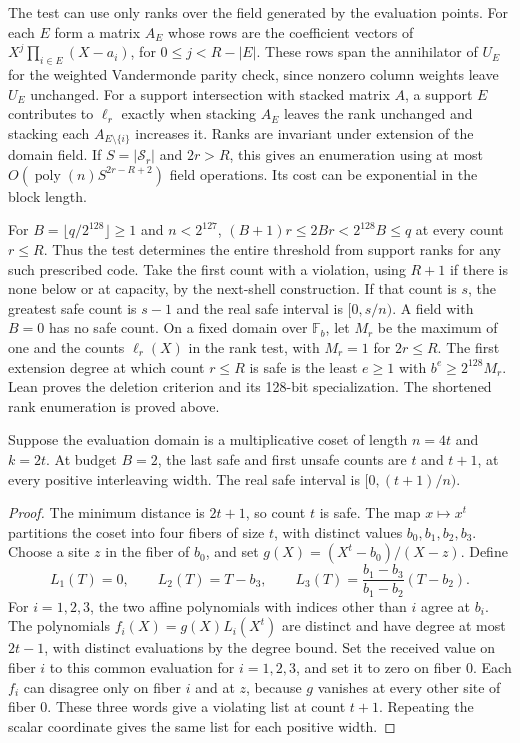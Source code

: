 The test can use only ranks over the field generated by the evaluation
points. For each \(E\) form a matrix \(A_E\) whose rows are the coefficient
vectors of \(X^j\prod_{i\in E}(X-a_i)\), for \(0\le j<R-|E|\). These
rows span the annihilator of \(U_E\) for the weighted Vandermonde parity
check, since nonzero column weights leave \(U_E\) unchanged. For a support
intersection with stacked matrix \(A\), a support \(E\) contributes to
\(\ell_r\) exactly when stacking \(A_E\) leaves the rank unchanged and
stacking each \(A_{E\setminus\{i\}}\) increases it. Ranks are invariant
under extension of the domain field. If \(S=|\mathcal S_r|\) and
\(2r>R\), this gives an enumeration using at most
\(O(\operatorname{poly}(n) S^{2r-R+2})\) field operations. Its cost can
be exponential in the block length.

For \(B=\lfloor q/2^{128}\rfloor\ge1\) and \(n<2^{127}\),
\((B+1)r\le 2Br<2^{128}B\le q\) at every count \(r\le R\).
Thus the test determines the entire threshold from support ranks for
any such prescribed code. Take the first count with a violation, using
\(R+1\) if there is none below or at capacity, by the next-shell
construction. If that count is \(s\), the greatest safe count is
\(s-1\) and the real safe interval is \([0,s/n)\). A field with
\(B=0\) has no safe count. On a fixed domain over \(\mathbb F_b\), let
\(M_r\) be the maximum of one and the counts \(\ell_r(X)\) in the rank
test, with \(M_r=1\) for \(2r\le R\). The first extension degree at
which count \(r\le R\) is safe is the least \(e\ge1\) with
\(b^e\ge2^{128}M_r\). Lean proves the deletion criterion and its
128-bit specialization. The shortened rank enumeration is proved above.

\begin{corollary}
\label{cor:list-two-half-rate}
Suppose the evaluation domain is a multiplicative coset of length
\(n=4t\) and \(k=2t\). At budget \(B=2\), the last safe and first unsafe
counts are \(t\) and \(t+1\), at every positive interleaving width.
The real safe interval is \([0,(t+1)/n)\).
\end{corollary}

\begin{proof}
The minimum distance is \(2t+1\), so count \(t\) is safe. The map
\(x\mapsto x^t\) partitions the coset into four fibers of size \(t\),
with distinct values \(b_0,b_1,b_2,b_3\). Choose a site \(z\) in the
fiber of \(b_0\), and set \(g(X)=(X^t-b_0)/(X-z)\). Define
\[
 L_1(T)=0,\qquad L_2(T)=T-b_3,\qquad
 L_3(T)=\frac{b_1-b_3}{b_1-b_2}(T-b_2).
\]
For \(i=1,2,3\), the two affine polynomials with indices other than
\(i\) agree at \(b_i\). The polynomials \(f_i(X)=g(X)L_i(X^t)\)
are distinct and have degree at most \(2t-1\), with distinct evaluations
by the degree bound. Set the received value on fiber \(i\) to this
common evaluation for \(i=1,2,3\), and set it to zero on fiber \(0\).
Each \(f_i\) can disagree only on fiber \(i\) and at \(z\), because
\(g\) vanishes at every other site of fiber \(0\). These three words
give a violating list at count \(t+1\). Repeating the scalar coordinate
gives the same list for each positive width.
\end{proof}

